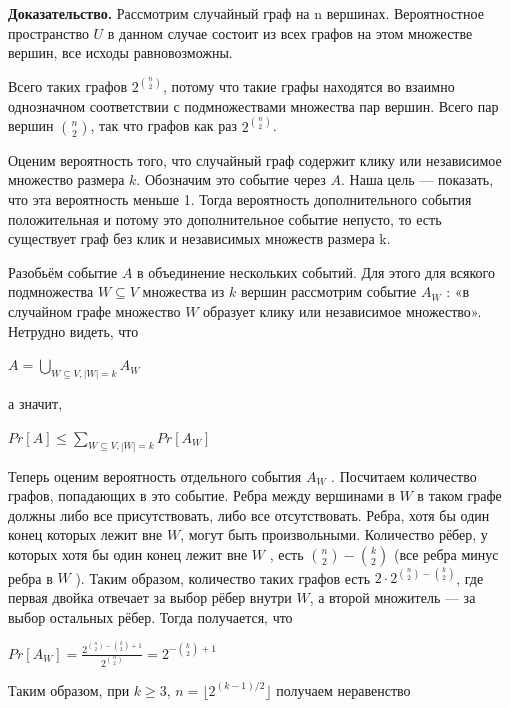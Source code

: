 \documentclass[a4paper, 10pt]{article}
\begin{document}
\textbf{Доказательство.} Рассмотрим случайный граф на n вершинах. Вероятностное пространство $U$ в данном случае состоит из всех графов на этом множестве вершин, все исходы равновозможны.

Всего таких графов $2^{\binom{n}{2}}$, потому что такие графы находятся во взаимно однозначном соответствии с подмножествами множества пар вершин. Всего пар вершин $\binom{n}{2}$, так что графов как раз $2^{\binom{n}{2}}$.

Оценим вероятность того, что случайный граф содержит клику или независимое множество размера $k$. Обозначим это событие через $A$. Наша цель — показать, что эта вероятность меньше 1. Тогда вероятность дополнительного события положительная и потому это дополнительное событие непусто, то есть существует граф без клик и независимых множеств размера k.

Разобьём событие $A$ в объединение нескольких событий. Для этого для всякого подмножества $W \subseteq V$ множества из $k$ вершин рассмотрим событие $A_W$ : «в случайном графе множество $W$ образует клику или независимое множество». Нетрудно видеть, что

\begin{center}
    $\displaystyle A = \bigcup_{W \subseteq V,|W| = k} A_W$
\end{center}

а значит,

\begin{center}
    $\displaystyle Pr[A] \leqslant \sum_{W \subseteq V,|W| = k} Pr[A_W]$
\end{center}

Теперь оценим вероятность отдельного события $A_W$ . Посчитаем количество графов, попадающих в это событие. Ребра между вершинами в $W$ в таком графе должны либо все присутствовать, либо все отсутствовать. Ребра, хотя бы один конец которых лежит вне $W$, могут быть произвольными. Количество рёбер, у которых хотя бы один конец лежит вне $W$ , есть $\binom{n}{2} - \binom{k}{2}$ (все ребра минус ребра в $W$ ). Таким образом, количество таких графов есть $2 \cdot 2^{\binom{n}{2} - \binom{k}{2}}$, где первая двойка отвечает за выбор рёбер внутри $W$, а второй множитель — за выбор остальных рёбер. Тогда получается, что

\begin{center}
    $\displaystyle Pr[A_W] = \frac{2^{\binom{n}{2} - \binom{k}{2} + 1}}{2^{\binom{n}{2}}} = 2^{-\binom{k}{2} + 1}$
\end{center}

Таким образом, при $k \geqslant 3$, $n = \lfloor 2^{(k-1)/2}\rfloor$ получаем неравенство
\end{document}
